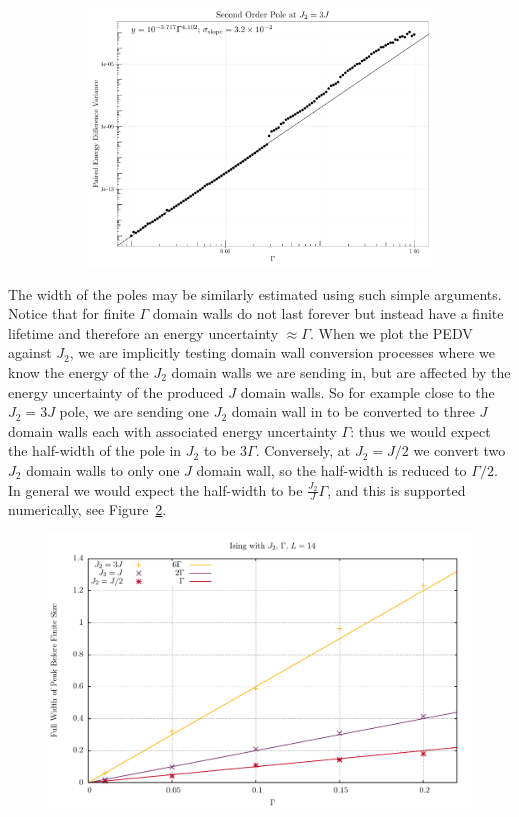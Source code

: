 \documentclass [a4paper, 11pt]{article}
\begin{document}
\begin{figure} [htbp]
\begin{subfigure}{.33\textwidth}
  \includegraphics[width=\linewidth]{pole30_gamma_dep.pdf}
\caption{}
\end{subfigure}
\caption{}
\label{fig:poleheight}
\end{figure}

The width of the poles may be similarly estimated using such simple arguments. Notice that for finite $\Gamma$ domain walls do not last forever but instead have a finite lifetime and therefore an energy uncertainty $\approx \Gamma$. When we plot the PEDV against $J_2$, we are implicitly testing domain wall conversion processes where we know the energy of the $J_2$ domain walls we are sending in, but are affected by the energy uncertainty of the produced $J$ domain walls. So for example close to the $J_2 = 3 J$ pole, we are sending one $J_2$ domain wall in to be converted to three $J$ domain walls each with associated energy uncertainty $\Gamma$: thus we would expect the half-width of the pole in $J_2$ to be $3 \Gamma$. Conversely, at $J_2 = J/2$ we convert two $J_2$ domain walls to only one $J$ domain wall, so the half-width is reduced to $\Gamma/2$. In general we would expect the half-width to be $\frac{J_2}{J} \Gamma$, and this is supported numerically, see Figure~\ref{fig:width}.

\begin{figure} [htbp]
\centering
 \includegraphics[width=\linewidth]{width_of_poles.pdf}
\caption{}
\label{fig:width}
\end{figure}
\end{document}
